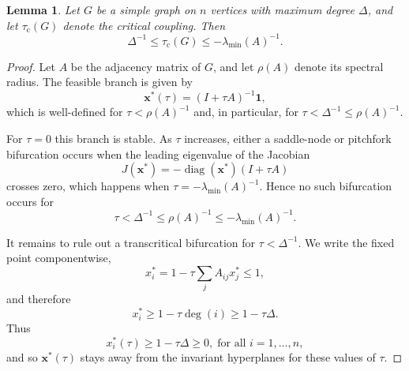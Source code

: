 \documentclass[a4paper,12pt]{article}
\newtheorem{lemma}{Lemma}
\DeclareMathOperator {\diag}{\text{diag}}
\begin{document}
\begin{lemma}\label{lem:critical_coupling_lower}
    Let $G$ be a simple graph on $n$ vertices with maximum degree $\Delta$, and let $\tau_{\mathrm c}(G)$ denote the critical coupling. Then \[\Delta^{-1} \le \tau_{\mathrm c}(G) \le -\lambda_{\min}(A)^{-1}.\]
\end{lemma}
\begin{proof}
    Let $A$ be the adjacency matrix of $G$, and let $\rho(A)$ denote its spectral radius. The feasible branch is given by
    \begin{equation*}
        \mathbf{x^*}(\tau) = (I + \tau A)^{-1}\mathbf{1},
    \end{equation*}
    which is well-defined for $\tau <\rho(A)^{-1}$ and, in particular, for $\tau < \Delta^{-1}\le\rho(A)^{-1}$.
    
    For $\tau=0$ this branch is stable. As $\tau$ increases,
    either a saddle-node or pitchfork bifurcation occurs when the leading eigenvalue of the Jacobian
    \begin{equation*}
        J(\mathbf{x^*}) = -\diag(\mathbf{x^*})(I + \tau A)
    \end{equation*}
    crosses zero, which happens when
    $\tau = -\lambda_{\min}(A)^{-1}.$
    Hence no such bifurcation occurs for
    \begin{equation*}
        \tau < \Delta^{-1} \le \rho(A)^{-1} \le -\lambda_{\min}(A)^{-1}.
    \end{equation*}
    
    It remains to rule out a transcritical bifurcation for $\tau < \Delta^{-1}$. We write the fixed point componentwise,
    \begin{equation*}
        x_i^* = 1 - \tau \sum_{j} A_{ij} x_j^* \le 1,
    \end{equation*}
    and therefore
    \begin{equation*}
        x_i^* \ge 1 - \tau \deg(i) \ge 1 - \tau \Delta.
    \end{equation*}
    Thus
    \begin{equation*}
     x_i^*(\tau) \ge 1 - \tau \Delta \ge 0, \; \text{for all } i =1,\dots,n,
    \end{equation*} 
    and so $\mathbf{x^*}(\tau)$ stays away from the invariant hyperplanes for these values of $\tau$. 
\end{proof}
\end{document}
